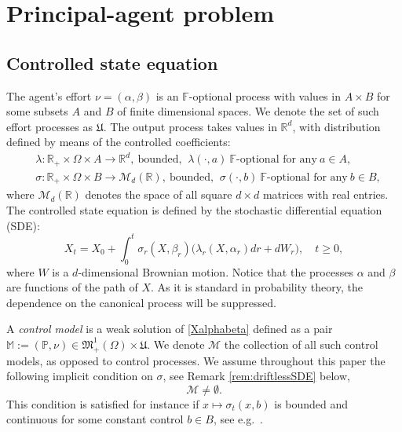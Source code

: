 \documentclass[11pt,a4paper]{article}
\numberwithin{equation}{section}
\def\dbF{\mathbb{F}}
\def\dbM{\mathbb{M}}
\def\dbP{\mathbb{P}}
\def\dbR{\mathbb{R}}
\newcommand{\cM}{\mathcal{M}}
\theoremstyle{definition}
\begin{document}
\section{Principal-agent problem} 
\label{sec:formulation}

\subsection{Controlled state equation}
The agent's effort $\nu=(\alpha,\beta)$ is an $\dbF$-optional process with values in $A\times B$ for some subsets $A$ and $B$ of finite dimensional spaces. We denote the set of such effort processes as $\mathfrak{U}$. 
The output process takes values in $\dbR^d$, with distribution defined by means of the controlled coefficients:
 \begin{align*}
   & \lambda:\dbR_+\times\Omega\times A\longrightarrow \dbR^d, ~\mbox{bounded, }~\lambda(\cdot,a)~\dbF\mbox{-optional for any}~a\in A, \\
   &  \sigma:\dbR_+\times\Omega\times B\longrightarrow \mathcal M_{d}(\dbR), ~\mbox{bounded, }~\sigma(\cdot,b)~\dbF\mbox{-optional for any}~b\in B,
 \end{align*} 
where $\mathcal M_{d}(\mathbb R)$ denotes the space of all square $d\times d$ matrices with real entries.
The controlled state equation is defined by the stochastic differential equation (SDE):
 \begin{equation} \label{Xalphabeta}
   X_t = X_0 + \int_0^t\sigma_r(X,\beta_r)\big(\lambda_r(X,\alpha_r)dr + dW_r\big), \quad t\geq 0, 
 \end{equation}
 where $W$ is a $d$-dimensional Brownian motion. 
Notice that the processes $\alpha$ and $\beta$ are functions of the path of $X$. As it is standard in probability theory, the dependence on the canonical process will be suppressed.

A {\it control model} is a weak solution of \eqref{Xalphabeta} defined as a pair $\dbM:=(\dbP,\nu)\in\mathfrak{M}_+^1(\Omega)\times\mathfrak{U}$. 
We denote $\cM$ the collection of all such control models, as opposed to control processes. 
We assume throughout this paper the following implicit condition on $\sigma$, see Remark \ref{rem:driftlessSDE} below, 
 \begin{equation}\label{eq:Mnonvide}
   \cM\neq\emptyset.
 \end{equation}
This condition is satisfied for instance if $x\mapsto\sigma_t(x,b)$ is bounded and continuous for some constant control $b\in B$, see e.g.~\cite[Theorem 5.4.22, Remark 5.4.23]{KS91}.
\end{document}

